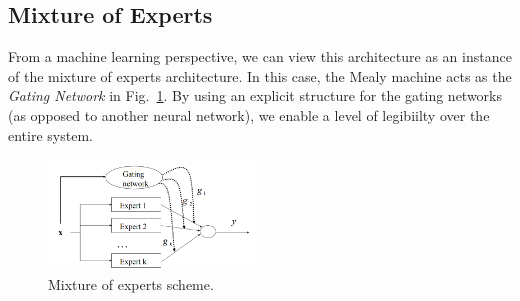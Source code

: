 \subsection{Mixture of Experts}

From a machine learning perspective, we can view this architecture as an instance of the mixture of experts architecture.
In this case, the Mealy machine acts as the \textit{Gating Network} in Fig.~\ref{fig:MOE}.
By using an explicit structure for the gating networks (as opposed to another neural network), we enable a level of legibiilty over the entire system.

\begin{figure}[h!] %
\centering
	\includegraphics[width=0.49\textwidth]{MOE.png}
\caption{Mixture of experts scheme.}
\label{fig:MOE}
\end{figure}

